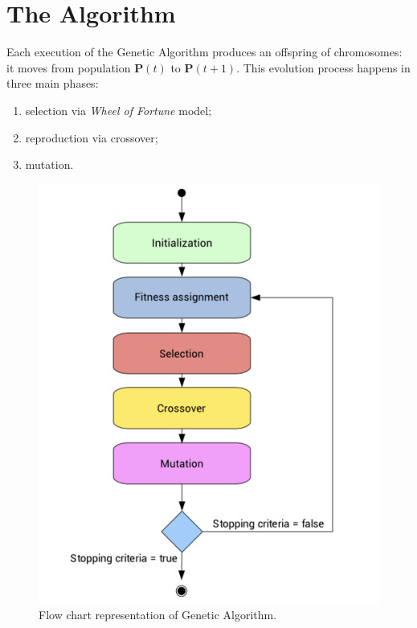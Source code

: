 \documentclass[%
    corpo=11pt,
    twoside,
    stile=classica,
    oldstyle,
    autoretitolo,
    tipotesi=magistrale,
    greek,
    evenboxes,
    english
]{toptesi}
\begin{document}
\section{The Algorithm}
Each execution of the Genetic Algorithm produces an offspring of chromosomes: it moves from  population $\textbf{P}(t)$ to $\textbf{P}(t+1)$. This evolution process happens in three main phases:
\begin{enumerate}
\item selection via \textit{Wheel of Fortune} model;
\item reproduction via crossover;
\item mutation.
\end{enumerate}
\begin{figure}[h]
\centering
\includegraphics[scale = 0.25]{pictures/genetic_algo.png}
\caption{Flow chart representation of Genetic Algorithm.}
\label{fig:genalgo}
\end{figure}
\end{document}
